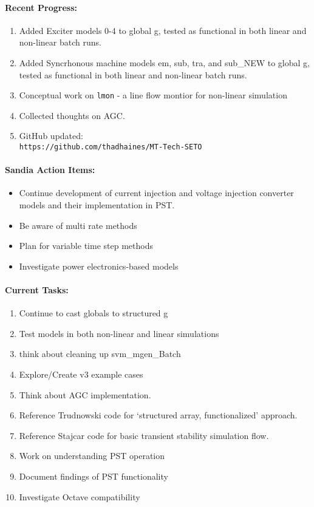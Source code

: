 \documentclass[12pt]{article}
\begin{document}
\begin{multicols}{2}
\raggedright

\paragraph{Recent Progress:}
	\begin{enumerate}
		\itemsep0em 
		\item Added Exciter models 0-4 to global g, tested as functional in both linear and non-linear batch runs.
		\item Added Syncrhonous machine models em, sub, tra, and sub\_NEW to global g, tested as functional in both linear and non-linear batch runs.
		\item Conceptual work on \verb|lmon| - a line flow montior for non-linear simulation
		\item Collected thoughts on AGC.
		\item GitHub updated:\\
	{\footnotesize	\verb|https://github.com/thadhaines/MT-Tech-SETO| }\\
	\end{enumerate}
	

\paragraph{Sandia Action Items:}
	\begin{itemize}
		\itemsep 0em 
			\item Continue development of current injection and voltage injection converter models and their implementation in PST.
			\item Be aware of multi rate methods
			\item Plan for variable time step methods
			\item Investigate power electronics-based models
	\end{itemize}

	
\paragraph{Current Tasks:}
	\begin{enumerate}
		\itemsep 0em 
		\item Continue to cast globals to structured g
		\item Test models in both non-linear and linear simulations
		\item think about cleaning up svm\_mgen\_Batch
		\item Explore/Create v3 example cases
		\item Think about AGC implementation.
		\item Reference Trudnowski code for `structured array, functionalized' approach.
		\item Reference Stajcar code for basic transient stability simulation flow.
		\item Work on understanding PST operation
		\item Document findings of PST functionality
		\item Investigate Octave compatibility
\end{enumerate}


\end{multicols}
\end{document}
